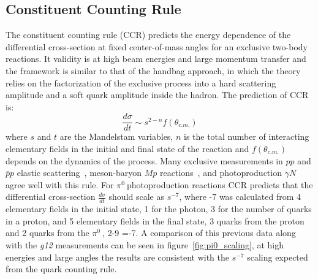 \documentclass{aip-cp}
\def\g12{\emph{g12}}
\def\piz{$\pi^{0}\ $}
\begin{document}
\subsection{Constituent Counting Rule}
The constituent counting rule (CCR) predicts the energy dependence of the differential cross-section at fixed center-of-mass angles for an exclusive two-body reactions. It validity is at high beam energies and large momentum transfer and the framework is similar to that of the handbag approach, in which the theory relies on the factorization of the exclusive process into a hard scattering amplitude and a soft quark amplitude inside the hadron. The prediction of CCR is:
\begin{equation}
\frac{d\sigma}{dt} \sim s^{2-n}f(\theta_{c.m.}) \label{CCR}
\end{equation}
where $s$ and $t$ are the Mandelstam variables, $n$ is the total number of interacting elementary fields in the initial and final state of the reaction and $f(\theta_{c.m.})$ depends on the dynamics of the process. Many exclusive measurements in $pp$ and  $\bar{p}p$ elastic scattering~\cite{scalingexp5, scalingexp7}, meson-baryon $M p$ reactions~\cite{scalingexp7}, and photoproduction $\gamma N$~\cite{scalingexp2, scalingexp3, scalingexp4, scalingexp6, scalingexp8, scalingexp9, scalingexp10, scalingexp11} agree well with this rule. For \piz photoproduction reactions CCR predicts that the differential cross-section $\frac{d\sigma}{dt}$ should scale as $s^{-7}$, where -7 was calculated from 4 elementary fields in the initial state, 1 for the photon, 3 for the number of quarks in a proton, and 5 elementary fields in the final state, 3 quarks from the proton and  2 quarks from the \piz, 2-9 =-7. A comparison of this previous data along with the \g12 measurements can be seen in figure~\ref{fig:pi0_scaling}, at high energies and large angles the results are consistent with the $s^{−7}$ scaling expected from the quark counting rule. 
\end{document}

